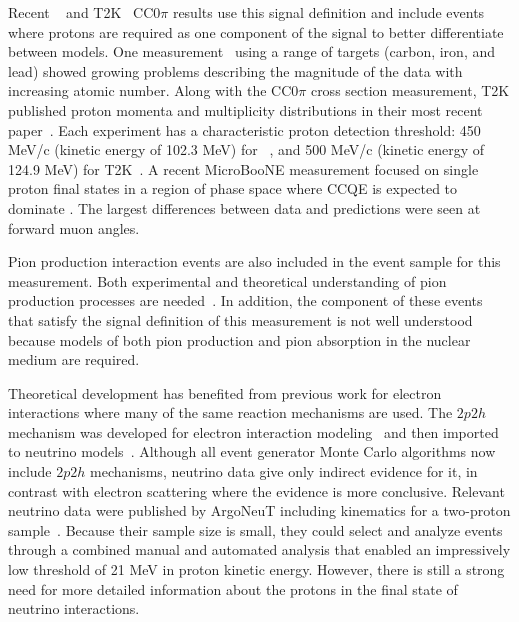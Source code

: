 \documentclass[%
twocolumn,
 amsmath,amssymb,
 aps,
prd,
superscriptaddress,showpacs]{revtex4-2}
\begin{document}
Recent \minerva~\cite{Betancourt:2017uso,Ruterbories:2018gub} and T2K~\cite{Abe:2018pwo} CC$0\pi$ results use this signal definition and include events where protons are required as one component of the signal to better differentiate between models. 
One \minerva measurement~\cite{Betancourt:2017uso} using a range of targets (carbon, iron, and lead) showed growing problems describing the magnitude of the data with increasing atomic number.
Along with the CC$0\pi$ cross section measurement, T2K published proton momenta and multiplicity distributions in their most recent paper~\cite{Abe:2018pwo}.
Each experiment has a characteristic proton detection threshold: 450 MeV/c (kinetic energy of 102.3 MeV) for \minerva~\cite{Betancourt:2017uso,Ruterbories:2018gub}, and 500 MeV/c (kinetic energy of 124.9 MeV) for T2K~\cite{Abe:2018pwo}.
A recent MicroBooNE measurement focused on single proton final states in a region of phase space where CCQE is expected to dominate \cite{uB_CCQE_2020}.  The largest differences between data and predictions were seen at forward muon angles.

Pion production interaction events are also included in the event sample for this measurement.  
Both experimental and theoretical understanding of pion production processes are needed~\cite{nustec-review}.
In addition, the component of these events that satisfy the signal definition of this measurement is not well understood because models of both pion production and pion absorption in the nuclear medium are required.

Theoretical development has benefited from previous work for electron interactions where many of the same reaction mechanisms are used.
The $2p2h$ mechanism was developed for electron interaction modeling~\cite{Megias:2016fjk} and then imported to neutrino models~\cite{Martini:2011wp}. 
Although all event generator Monte Carlo algorithms now include $2p2h$ mechanisms, neutrino data give only indirect evidence for it, in contrast with electron scattering where the evidence is more conclusive. 
Relevant neutrino data were published by ArgoNeuT including kinematics for a two-proton sample~\cite{Argoneut-2p}. 
Because their sample size is small, they could select and analyze events through a combined manual and automated analysis that enabled an impressively low threshold of 21 MeV in proton kinetic energy.
However, there is still a strong need for more detailed information about the protons in the final state of neutrino interactions.
\end{document}
